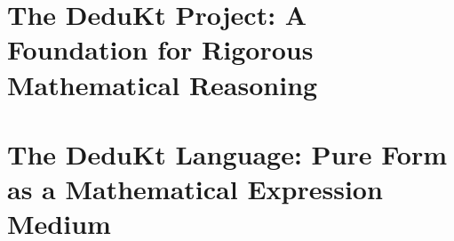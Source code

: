 \section{The DeduKt Project: A Foundation for Rigorous Mathematical Reasoning}\label{sec:the-dedukt-project:-a-foundation-for-rigorous-mathematical-reasoning}


\section{The DeduKt Language: Pure Form as a Mathematical Expression Medium}\label{sec:principles-of-dedukt-language}


